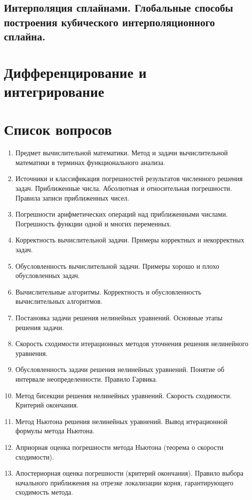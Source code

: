 \documentclass[14pt]{extarticle}
\begin{document}
\clearpage
\subsection{Интерполяция сплайнами. Глобальные способы построения кубического интерполяционного сплайна.}


\section{Дифференцирование и интегрирование}

\section{Список вопросов}
\begin{enumerate}
    \item Предмет вычислительной математики. Метод и задачи вычислительной математики в терминах функционального анализа. 
    \item Источники и классификация погрешностей результатов численного решения задач. Приближенные числа. Абсолютная и относительная погрешности. Правила записи приближенных чисел. 
    \item Погрешности арифметических операций над приближенными числами. Погрешность функции одной и многих переменных. 
    \item Корректность вычислительной задачи. Примеры корректных и некорректных задач. 
    \item Обусловленность вычислительной задачи. Примеры хорошо и плохо обусловленных задач. 
    \item Вычислительные алгоритмы. Корректность и обусловленность вычислительных алгоритмов. 
    \item Постановка задачи решения нелинейных уравнений. Основные этапы решения задачи. 
    \item Скорость сходимости итерационных методов уточнения решения нелинейного уравнения. 
    \item Обусловленность задачи решения нелинейных уравнений. Понятие об интервале неопределенности. Правило Гарвика. 
    \item Метод бисекции решения нелинейных уравнений. Скорость сходимости. Критерий окончания. 
    \item Метод Ньютона решения нелинейных уравнений. Вывод итерационной формулы метода Ньютона. 
    \item Априорная оценка погрешности метода Ньютона (теорема о скорости сходимости). 
    \item Апостериорная оценка погрешности (критерий окончания). Правило выбора начального приближения на отрезке локализации корня, гарантирующего сходимость метода. 

\end{enumerate}
\end{document}
